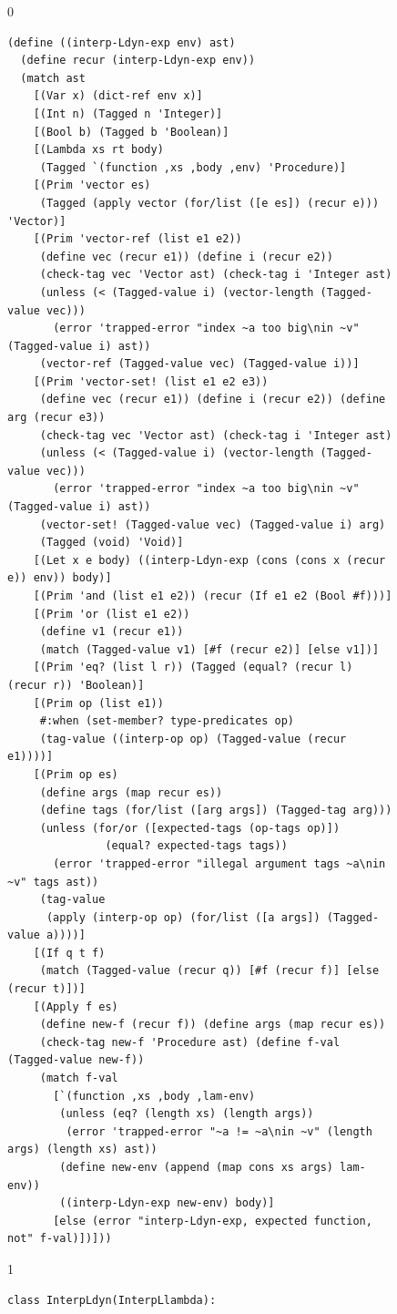 \documentclass[7x10]{TimesAPriori_MIT}%
\def\racketEd{0}
\def\pythonEd{1}
\def\edition{0}
\numberwithin{theorem}{chapter}
\numberwithin{definition}{chapter}
\numberwithin{equation}{chapter}
\begin{document}
\begin{figure}[tbp]
  \begin{tcolorbox}[colback=white]
    {\if\edition\racketEd
\begin{lstlisting}[basicstyle=\ttfamily\footnotesize]
(define ((interp-Ldyn-exp env) ast)
  (define recur (interp-Ldyn-exp env))
  (match ast
    [(Var x) (dict-ref env x)]
    [(Int n) (Tagged n 'Integer)]
    [(Bool b) (Tagged b 'Boolean)]
    [(Lambda xs rt body)
     (Tagged `(function ,xs ,body ,env) 'Procedure)]
    [(Prim 'vector es)
     (Tagged (apply vector (for/list ([e es]) (recur e))) 'Vector)]
    [(Prim 'vector-ref (list e1 e2))
     (define vec (recur e1)) (define i (recur e2))
     (check-tag vec 'Vector ast) (check-tag i 'Integer ast)
     (unless (< (Tagged-value i) (vector-length (Tagged-value vec)))
       (error 'trapped-error "index ~a too big\nin ~v" (Tagged-value i) ast))
     (vector-ref (Tagged-value vec) (Tagged-value i))]
    [(Prim 'vector-set! (list e1 e2 e3))
     (define vec (recur e1)) (define i (recur e2)) (define arg (recur e3))
     (check-tag vec 'Vector ast) (check-tag i 'Integer ast)
     (unless (< (Tagged-value i) (vector-length (Tagged-value vec)))
       (error 'trapped-error "index ~a too big\nin ~v" (Tagged-value i) ast))
     (vector-set! (Tagged-value vec) (Tagged-value i) arg)
     (Tagged (void) 'Void)]
    [(Let x e body) ((interp-Ldyn-exp (cons (cons x (recur e)) env)) body)]
    [(Prim 'and (list e1 e2)) (recur (If e1 e2 (Bool #f)))]
    [(Prim 'or (list e1 e2))
     (define v1 (recur e1))
     (match (Tagged-value v1) [#f (recur e2)] [else v1])]
    [(Prim 'eq? (list l r)) (Tagged (equal? (recur l) (recur r)) 'Boolean)]
    [(Prim op (list e1))
     #:when (set-member? type-predicates op)
     (tag-value ((interp-op op) (Tagged-value (recur e1))))]
    [(Prim op es)
     (define args (map recur es))
     (define tags (for/list ([arg args]) (Tagged-tag arg)))
     (unless (for/or ([expected-tags (op-tags op)])
               (equal? expected-tags tags))
       (error 'trapped-error "illegal argument tags ~a\nin ~v" tags ast))
     (tag-value
      (apply (interp-op op) (for/list ([a args]) (Tagged-value a))))]
    [(If q t f)
     (match (Tagged-value (recur q)) [#f (recur f)] [else (recur t)])]
    [(Apply f es)
     (define new-f (recur f)) (define args (map recur es))
     (check-tag new-f 'Procedure ast) (define f-val (Tagged-value new-f))
     (match f-val 
       [`(function ,xs ,body ,lam-env)
        (unless (eq? (length xs) (length args))
         (error 'trapped-error "~a != ~a\nin ~v" (length args) (length xs) ast))
        (define new-env (append (map cons xs args) lam-env))
        ((interp-Ldyn-exp new-env) body)]
       [else (error "interp-Ldyn-exp, expected function, not" f-val)])]))
\end{lstlisting}
\fi}
{\if\edition\pythonEd
\begin{lstlisting}[basicstyle=\ttfamily\footnotesize]
class InterpLdyn(InterpLlambda):
  

\end{lstlisting}}
\end{tcolorbox}
\end{figure}
\end{document}
